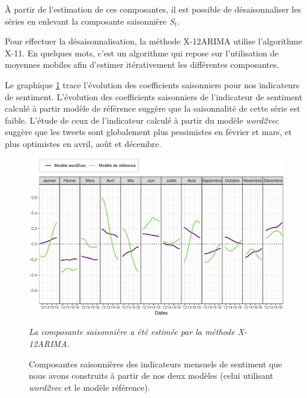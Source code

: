 \documentclass[11pt,french,french]{article}
\begin{document}
À partir de l'estimation de ces composantes, il est possible de désaisonnaliser les séries en enlevant la composante saisonnière \(S_t\).

Pour effectuer la désaisonnalisation, la méthode X-12ARIMA utilise l'algorithme X-11.
En quelques mots, c'est un algorithme qui repose sur l'utilisation de moyennes mobiles afin d'estimer itérativement les différentes composantes.

Le graphique \ref{fig:coefcvscjo} trace l'évolution des coefficients saisonniers pour nos indicateurs de sentiment.
L'évolution des coefficients saisonniers de l'indicateur de sentiment calculé à partir modèle de référence suggère que la saisonnalité de cette série est faible.
L'étude de ceux de l'indicateur calculé à partir du modèle \emph{word2vec} suggère que les tweets sont globalement plus pessimistes en février et mars, et plus optimistes en avril, août et décembre.

\begin{figure}[htp]
{\centering\includegraphics[width = \textwidth]{img/rmd-graphCoefCVS-1}}
\captionsetup{margin=0cm,format=hang,justification=justified}
\caption{Composantes saisonnières des indicateurs mensuels de sentiment que nous avons construits à partir de nos deux modèles (celui utilisant  \emph{word2vec} et le modèle référence).}\label{fig:coefcvscjo}
\footnotesize

\emph{La composante saisonnière a été estimée par la méthode X-12ARIMA.}
\end{figure}

\newpage

\footnotesize

\nocite{*}
\end{document}
